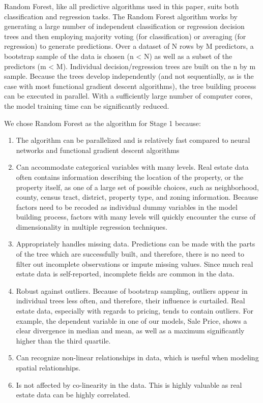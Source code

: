\documentclass[12pt,]{article}
\providecommand{\tightlist}{%
  \setlength{\itemsep}{0pt}\setlength{\parskip}{0pt}}
\begin{document}
Random Forest, like all predictive algorithms used in this paper, suits
both classification and regression tasks. The Random Forest algorithm
works by generating a large number of independent classification or
regression decision trees and then employing majority voting (for
classification) or averaging (for regression) to generate predictions.
Over a dataset of N rows by M predictors, a bootstrap sample of the data
is chosen (n \textless{} N) as well as a subset of the predictors (m
\textless{} M). Individual decision/regression trees are built on the n
by m sample. Because the trees develop independently (and not
sequentially, as is the case with most functional gradient descent
algorithms), the tree building process can be executed in parallel. With
a sufficiently large number of computer cores, the model training time
can be significantly reduced.

We chose Random Forest as the algorithm for Stage 1 because:

\begin{enumerate}
\def\labelenumi{\arabic{enumi})}
\tightlist
\item
  The algorithm can be parallelized and is relatively fast compared to
  neural networks and functional gradient descent algorithms
\item
  Can accommodate categorical variables with many levels. Real estate
  data often contains information describing the location of the
  property, or the property itself, as one of a large set of possible
  choices, such as neighborhood, county, census tract, district,
  property type, and zoning information. Because factors need to be
  recoded as individual dummy variables in the model building process,
  factors with many levels will quickly encounter the curse of
  dimensionality in multiple regression techniques.
\item
  Appropriately handles missing data. Predictions can be made with the
  parts of the tree which are successfully built, and therefore, there
  is no need to filter out incomplete observations or impute missing
  values. Since much real estate data is self-reported, incomplete
  fields are common in the data.
\item
  Robust against outliers. Because of bootstrap sampling, outliers
  appear in individual trees less often, and therefore, their influence
  is curtailed. Real estate data, especially with regards to pricing,
  tends to contain outliers. For example, the dependent variable in one
  of our models, Sale Price, shows a clear divergence in median and
  mean, as well as a maximum significantly higher than the third
  quartile.
\item
  Can recognize non-linear relationships in data, which is useful when
  modeling spatial relationships.
\item
  Is not affected by co-linearity in the data. This is highly valuable
  as real estate data can be highly correlated.
\end{enumerate}
\end{document}
